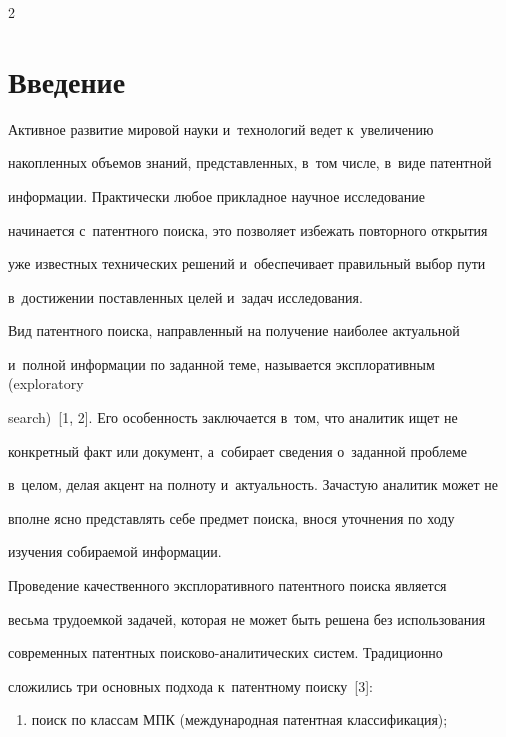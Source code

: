 \begin{multicols}{2}



\label{st\stat}



\section{Введение}



  Активное развитие мировой науки и~технологий ведет к~увеличению 

накопленных объемов знаний, представленных, в~том числе, в~виде патентной 

информации. Практически любое прикладное научное исследование 

начинается с~патентного поиска, это позволяет избежать повторного открытия 

уже известных технических решений и~обеспечивает правильный выбор пути 

в~достижении по\-став\-лен\-ных целей и~задач исследования.

  

  Вид патентного поиска, направленный на получение наиболее актуальной 

  и~полной информации по заданной теме, называется эксплоративным (exploratory 

search)~[1, 2]. Его особенность заключается в~том, что аналитик ищет не 

конкретный факт или документ, а~собирает сведения о~заданной проб\-ле\-ме 

в~целом, делая акцент на полноту и~актуальность. Зачастую аналитик может не 

вполне ясно пред\-став\-лять себе предмет поиска, внося уточнения по ходу 

изучения собираемой информации. 

  

  Проведение качественного эксплоративного патентного поиска является 

весьма трудоемкой зада\-чей, которая не может быть решена без использования 

современных патентных поисково-ана\-ли\-ти\-че\-ских сис\-тем. Традиционно 

сложились три основных подхода к~патентному поиску~[3]:

  \begin{enumerate}[(1)]

\item   поиск по классам МПК (международная патентная классификация);


\end{enumerate}
\end{multicols}
